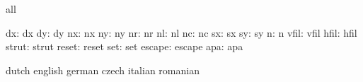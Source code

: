 


\startconstants            all

                       dx: dx
                       dy: dy
                       nx: nx
                       ny: ny
                       nr: nr
                       nl: nl
                       nc: nc
                       sx: sx
                       sy: sy
                        n: n
                     vfil: vfil
                     hfil: hfil
                    strut: strut
                    reset: reset
                      set: set
                   escape: escape
                      apa: apa

\stopconstants




\startvariables            dutch                     english
                           german                    czech
                           italian                   romanian

